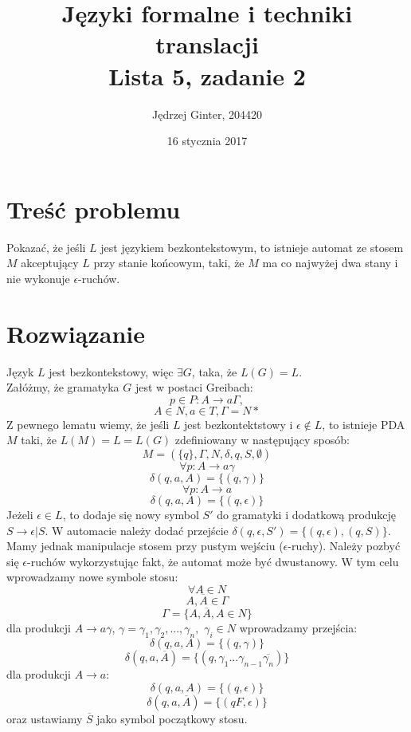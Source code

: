 \documentclass[10pt,a4paper]{article}
\begin{document}
\title{%
	Języki formalne i techniki translacji\\
	\large Lista 5, zadanie 2}
\author{Jędrzej Ginter, 204420}
\date{16 stycznia 2017}
\maketitle

\section{Treść problemu}
Pokazać, że jeśli $L$ jest językiem bezkontekstowym, to istnieje automat ze stosem $M$ akceptujący $L$ przy stanie końcowym, taki, że $M$ ma co najwyżej dwa stany i nie wykonuje $\epsilon$-ruchów.

\section{Rozwiązanie}
Język $L$ jest bezkontekstowy, więc $\exists G$, taka, że $L(G) = L$.\\
Załóżmy, że gramatyka $G$ jest w postaci Greibach:
\[ p \in P : A \rightarrow a\Gamma, \]
\[ A \in N, a \in T, \Gamma = N* \]
Z pewnego lematu wiemy, że jeśli $L$ jest bezkontektstowy i $\epsilon \notin L$, to istnieje PDA $M$ taki, że $L(M) = L = L(G)$ zdefiniowany w następujący sposób:
\[ M = (\{q\}, \Gamma, N, \delta, q, S, \emptyset) \]
\[ \forall p : A \rightarrow a\gamma \] \[\delta(q, a, A) = \{(q, \gamma)\} \]
\[ \forall p : A \rightarrow a \] \[\delta(q, a, A) = \{(q, \epsilon)\} \]
Jeżeli $\epsilon \in L$, to dodaje się nowy symbol $S\prime$ do gramatyki i dodatkową produkcję $S \rightarrow \epsilon \vert S$. W automacie należy dodać przejście $\delta(q, \epsilon, S\prime) = \{(q, \epsilon),(q, S)\}$.
Mamy jednak manipulacje stosem przy pustym wejściu ($\epsilon$-ruchy). Należy pozbyć się $\epsilon$-ruchów wykorzystując fakt, że automat może być dwustanowy. W tym celu wprowadzamy nowe symbole stosu:
\[ \forall A \in N \]
\[ A, \overline{A} \in \Gamma \]
\[ \Gamma = \{A, \overline{A}, A \in N\} \]
dla produkcji $ A \rightarrow a\gamma$, $\gamma = \gamma_{1},\gamma_{2}, ..., \gamma_{n},$ $\gamma_{i} \in N $ wprowadzamy przejścia:
\[ \delta(q, a, A) = \{(q, \gamma)\}\]
\[ \delta(q, a, \overline{A}) = \{(q,  \gamma_{1}...\gamma_{n-1}\overline{\gamma_{n}})\} \]
dla produkcji $A \rightarrow a$:
\[ \delta(q, a, A) = \{(q, \epsilon)\} \]
\[ \delta(q, a, \overline{A}) = \{(qF , \epsilon)\} \]
oraz ustawiamy $\overline{S}$ jako symbol początkowy stosu.
\end{document}
